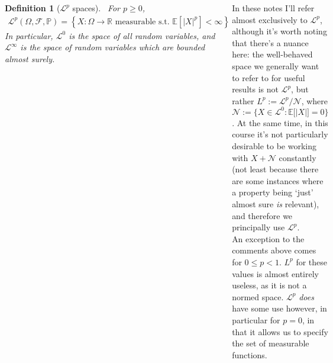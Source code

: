 \documentclass{tikzposter} %
\newtheorem{definition}{Definition}
\begin{document}
\begin{columns}
{    \begin{definition}[$\mathcal{L}^{p}$ spaces]
      \ For $p \ge 0$,
      \begin{align*}
        \mathcal{L}^{p}(\Omega, \mathcal{F}, \mathbb{P}) = \left\{X : \Omega \to \mathbb{R} \text{ measurable s.t. } \mathbb{E}\left[|X|^{p}\right] < \infty\right\}
      \end{align*}
      In particular, $\mathcal{L}^{0}$ is the space of all random variables, and $\mathcal{L}^{\infty}$ is the space of random variables which are bounded almost surely.
    \end{definition}
    \hphantom{}

    In these notes I'll refer almost exclusively to $\mathcal{L}^{p}$, although it's worth noting that there's a nuance here: the well-behaved space we generally want to refer to for useful results is not $\mathcal{L}^{p}$, but rather $L^{p} := \mathcal{L}^{p} / \mathcal{N}$, where $\mathcal{N} := \{X \in \mathcal{L}^{0} : \mathbb{E}\big[|X|\big] = 0\}$. At the same time, in this course it's not particularly desirable to be working with $X+\mathcal{N}$ constantly (not least because there are some instances where a property being `just' almost sure \emph{is} relevant), and therefore we principally use $\mathcal{L}^{p}$. \\

    An exception to the comments above comes for $0 \le p < 1$. $L^{p}$ for these values is almost entirely useless, as it is not a normed space. $\mathcal{L}^{p}$ \emph{does} have some use however, in particular for $p = 0$, in that it allows us to specify the set of measurable functions. \\

}
\end{columns}
\end{document}
